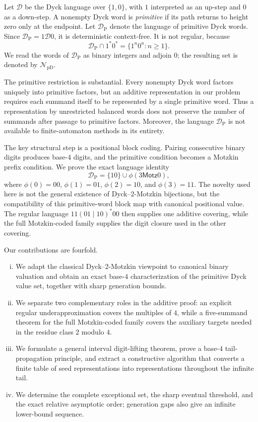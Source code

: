 \documentclass{ws-ijfcs}
\newcommand{\NpD}{\mathcal{N}_{\mathrm{pD}}}
\newcommand{\Dyck}{\mathcal{D}}
\newcommand{\DP}{\mathcal{D}_{\mathrm{P}}}
\begin{document}
Let $\Dyck$ be the Dyck language over $\{1,0\}$, with $1$ interpreted as
an up-step and $0$ as a down-step.  A nonempty Dyck word is
\emph{primitive} if its path returns to height zero only at the endpoint.
Let $\DP$ denote the language of primitive Dyck words.  Since
$\DP=1\Dyck0$, it is deterministic context-free.  It is not regular,
because
\[
 \DP\cap1^*0^*=\{1^n0^n:n\geq1\}.
\]
We read the words of $\DP$ as binary integers and adjoin $0$; the resulting
set is denoted by $\NpD$.

The primitive restriction is substantial.  Every nonempty Dyck word
factors uniquely into primitive factors, but an additive representation in
our problem requires each summand itself to be represented by a single
primitive word.  Thus a representation by unrestricted balanced words does
not preserve the number of summands after passage to primitive factors.
Moreover, the language $\DP$ is not available to finite-automaton methods
in its entirety.

The key structural step is a positional block coding.  Pairing consecutive
binary digits produces base-$4$ digits, and the primitive condition becomes
a Motzkin prefix condition.  We prove the exact language identity
\[
 \DP=\{10\}\cup\phi(3\mathsf{Motz}0),
\]
where $\phi(0)=00$, $\phi(1)=01$, $\phi(2)=10$, and $\phi(3)=11$.
The novelty used here is not the general existence of Dyck--2-Motzkin
bijections, but the compatibility of this primitive-word block map with
canonical positional value.  The regular language $11(01\mid10)^*00$
then supplies one additive covering, while the full Motzkin-coded family
supplies the digit closure used in the other covering.

Our contributions are fourfold.
\begin{enumerate}[(i)]
\item We adapt the classical Dyck--2-Motzkin viewpoint to canonical binary
valuation and obtain an exact base-$4$ characterization of the primitive
Dyck value set, together with sharp generation bounds.
\item We separate two complementary roles in the additive proof: an
explicit regular underapproximation covers the multiples of $4$, while a
five-summand theorem for the full Motzkin-coded family covers the auxiliary
targets needed in the residue class $2$ modulo $4$.
\item We formulate a general interval digit-lifting theorem, prove a
base-$4$ tail-propagation principle, and extract a constructive algorithm
that converts a finite table of seed representations into representations
throughout the infinite tail.
\item We determine the complete exceptional set, the sharp eventual
threshold, and the exact relative asymptotic order; generation gaps also
give an infinite lower-bound sequence.
\end{enumerate}
\end{document}
